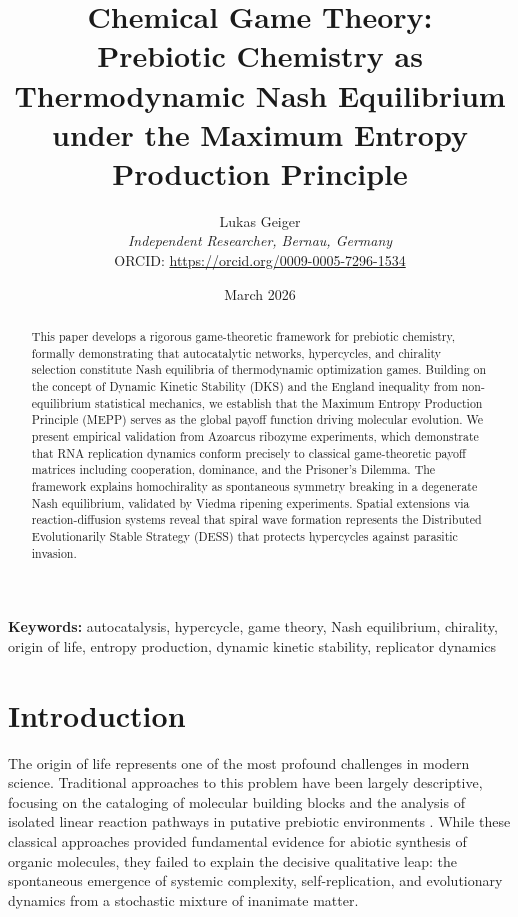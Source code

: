 \documentclass[12pt,a4paper]{article}
\title{Chemical Game Theory:\\
Prebiotic Chemistry as Thermodynamic Nash Equilibrium\\
under the Maximum Entropy Production Principle}
\author{Lukas Geiger\\
\textit{Independent Researcher, Bernau, Germany}\\
ORCID: \url{https://orcid.org/0009-0005-7296-1534}}
\date{March 2026}
\theoremstyle{remark}
\begin{document}
\maketitle

\begin{abstract}
This paper develops a rigorous game-theoretic framework for prebiotic chemistry, formally demonstrating that autocatalytic networks, hypercycles, and chirality selection constitute Nash equilibria of thermodynamic optimization games. Building on the concept of Dynamic Kinetic Stability (DKS) and the England inequality from non-equilibrium statistical mechanics, we establish that the Maximum Entropy Production Principle (MEPP) serves as the global payoff function driving molecular evolution. We present empirical validation from Azoarcus ribozyme experiments, which demonstrate that RNA replication dynamics conform precisely to classical game-theoretic payoff matrices including cooperation, dominance, and the Prisoner's Dilemma. The framework explains homochirality as spontaneous symmetry breaking in a degenerate Nash equilibrium, validated by Viedma ripening experiments. Spatial extensions via reaction-diffusion systems reveal that spiral wave formation represents the Distributed Evolutionarily Stable Strategy (DESS) that protects hypercycles against parasitic invasion.
\end{abstract}

\textbf{Keywords:} autocatalysis, hypercycle, game theory, Nash equilibrium, chirality, origin of life, entropy production, dynamic kinetic stability, replicator dynamics

\section{Introduction}
\label{sec:introduction}

The origin of life represents one of the most profound challenges in modern science. Traditional approaches to this problem have been largely descriptive, focusing on the cataloging of molecular building blocks and the analysis of isolated linear reaction pathways in putative prebiotic environments \citep{MillerUrey}. While these classical approaches provided fundamental evidence for abiotic synthesis of organic molecules, they failed to explain the decisive qualitative leap: the spontaneous emergence of systemic complexity, self-replication, and evolutionary dynamics from a stochastic mixture of inanimate matter.
\end{document}
